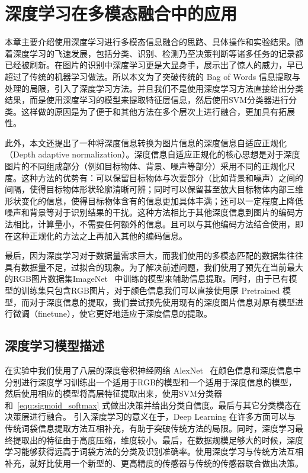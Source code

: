 \chapter{深度学习在多模态融合中的应用}
\label{cha:deeplearning}

本章主要介绍使用深度学习进行多模态信息融合的思路、具体操作和实验结果。随着深度学习的飞速发展，包括分类、识别、检测乃至决策判断等诸多任务的记录都已经被刷新。在图片的识别中深度学习更是大显身手，展示出了惊人的威力，早已超过了传统的机器学习做法。所以本文为了突破传统的 Bag of Words 信息提取与处理的局限，引入了深度学习方法。并且我们不是使用深度学习方法直接给出分类结果，而是使用深度学习的模型来提取特征层信息，然后使用SVM分类器进行分类。这样做的原因是为了便于和其他方法在多个层次上进行融合，更加具有拓展性。

此外，本文还提出了一种将深度信息转换为图片信息的深度信息自适应正规化（Depth adaptive normalization）。深度信息自适应正规化的核心思想是对于深度图片的不同组成部分（例如目标物体、背景、噪声等部分）采用不同的正规化尺度。这种方法的优势有：可以保留目标物体与次要部分（比如背景和噪声）之间的间隔，使得目标物体形状轮廓清晰可辨；同时可以保留甚至放大目标物体内部三维形状变化的信息，使得目标物体含有的信息更加具体丰满；还可以一定程度上降低噪声和背景等对于识别结果的干扰。这种方法相比于其他深度信息到图片的编码方法相比，计算量小，不需要任何额外的信息。且可以与其他编码方法结合使用，即在这种正规化的方法之上再加入其他的编码信息。

最后，因为深度学习对于数据量需求巨大，而我们使用的多模态匹配的数据集往往具有数据量不足，过拟合的现象。为了解决前述问题，我们使用了预先在当前最大的RGB图片数据集ImageNet~ 中训练的模型来辅助信息提取。同时，由于已有模型的训练集只包含RGB图片，对于颜色信息我们可以直接使用原 Pretrained 模型，而对于深度信息的提取，我们尝试预先使用现有的深度图片信息对原有模型进行微调（finetune），使它更好地适应于深度信息的提取。


\section{深度学习模型描述}
\label{sec:dModel}

在实验中我们使用了八层的深度卷积神经网络 AlexNet~ 在颜色信息和深度信息中分别进行深度学习训练出一个适用于RGB的模型和一个适用于深度信息的模型，然后使用相应的模型将高层特征提取出来，使用SVM分类器和~\ref{equ:sigmoid_softmax} 式做出决策并给出分类自信度。最后与其它分类模态在决策层进行融合。
引入深度学习的意义在于，Deep Learning 在许多方面可以与传统词袋信息提取方法互相补充，有助于突破传统方法的局限。同时，深度学习最终提取出的特征由于高度压缩，维度较小。最后，在数据规模足够大的时候，深度学习能够获得远高于词袋方法的分类及识别准确率。使用深度学习与传统方法互相补充，就好比使用一个新型的、更高精度的传感器与传统的传感器联合做出决策。

